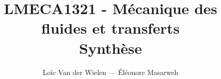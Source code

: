 \documentclass[a4paper,11pt]{report}
\title{LMECA1321 - Mécanique des fluides et transferts\\Synthèse}
\author{Loïc Van der Wielen --- Éléonore Masarweh}
\begin{document}
\maketitle
\tableofcontents








\begin{appendix}
  
\end{appendix}
\end{document}
